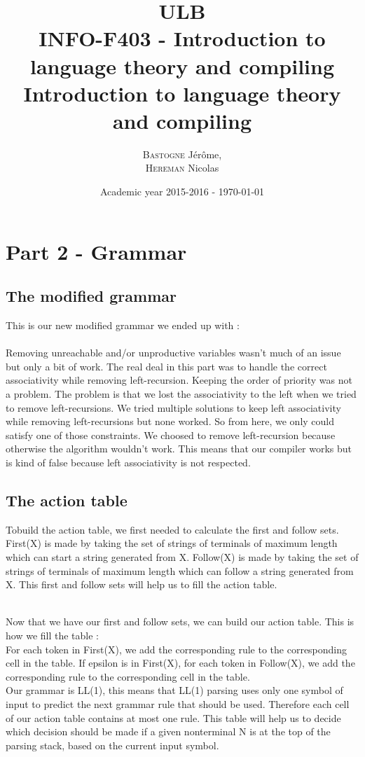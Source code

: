\documentclass[a4paper,10pt]{report}
\title{ULB\\
        INFO-F403 - Introduction to language theory and compiling \\
            Introduction to language theory and compiling}
\author{\textsc{Bastogne} Jérôme,\\
        \textsc{Hereman} Nicolas}
\date{Academic year 2015-2016 - \today}
\begin{document}
\maketitle
\clearpage


\chapter{Part 2 - Grammar}

\section{The modified grammar}

This is our new modified grammar we ended up with : \\




\hfill \\
Removing unreachable and/or unproductive variables wasn't much of an issue but only a bit of work. The real deal in this part was to handle the correct associativity while removing left-recursion. Keeping the order of priority was not a problem. The problem is that we lost the associativity to the left when we tried to remove left-recursions. We tried multiple solutions to keep left associativity while removing left-recursions but none worked. So from here, we only could satisfy one of those constraints. We choosed to remove left-recursion because otherwise the algorithm wouldn't work. This means that our compiler works but is kind of false because left associativity is not respected.

\section{The action table}

Tobuild the action table, we first needed to calculate the first and follow sets. First(X) is made by taking the set of strings of terminals of maximum length which can start a string generated from X. Follow(X) is made by taking the set of strings of terminals of maximum length which can follow a string generated from X. This first and follow sets will help us to fill the action table.




\hfil\\
Now that we have our first and follow sets, we can build our action table. This is how we fill the table :\\ For each token in First(X), we add the corresponding rule to the corresponding cell in the table. If epsilon is in First(X), for each token in Follow(X), we add the corresponding rule to the corresponding cell in the table.\\
Our grammar is LL(1), this means that LL(1) parsing uses only one symbol of input to predict the next grammar rule that should be used. Therefore each cell of our action table contains at most one rule. This table will help us to decide which decision should be made if a given nonterminal N is at the top of the parsing stack, based on the current input symbol.



\end{document}
